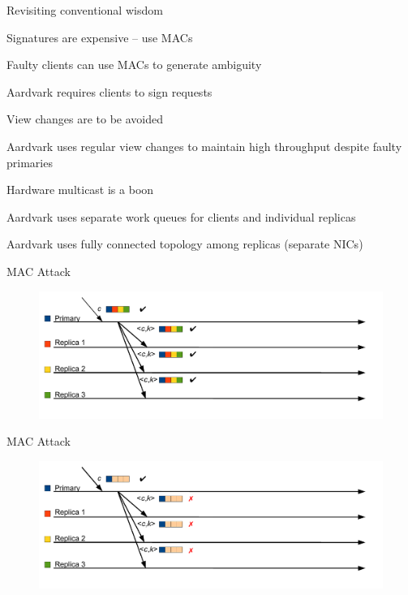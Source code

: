 \begin{frame}{Revisiting conventional wisdom}
	
\BIL
\item Signatures are expensive -- use MACs 
	\BI
	\item Faulty clients can use MACs to generate ambiguity 
	\item Aardvark requires clients to sign requests
	\EI
\item View changes are to be avoided
	\BI
	\item Aardvark uses regular view changes to maintain high throughput despite faulty primaries
	\EI
\item Hardware multicast is a boon
	\BI
	\item Aardvark uses separate work queues for clients and individual replicas	
	\item Aardvark uses fully connected topology among replicas
	  (separate NICs)
	\EI
\EIL	
\end{frame}

\begin{frame}{MAC Attack}

\begin{figure}
	\includegraphics[width=\textwidth]{figs/17/messages12}\\
\end{figure}

\end{frame}

\begin{frame}{MAC Attack}

\begin{figure}
	\includegraphics[width=\textwidth]{figs/17/messages13}\\
\end{figure}

\end{frame}

